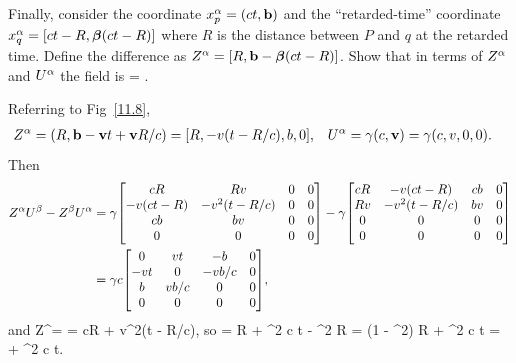 \newcommand{\Za}{Z^\alp}
\newcommand{\Zsa}{Z_\alp}
\newcommand{\Zb}{Z^\bet}
\newcommand{\vbet}{\boldsymbol{\beta}}

\begin{problem}
	Finally, consider the coordinate $x^\alpha_p = (ct, \vb{b})$ and the ``retarded-time'' coordinate $\xaq = [ct - R, \vbet(ct - R)]$ where $R$ is the distance between $P$ and $q$ at the retarded time.  Define the difference as $\Za = [R, \vbb - \vbet(ct - R)]$.  Show that in terms of $\Za$ and $U^\alpha$ the field is
	\beqn \label{show2.c}
		\Fab =  \frac{\Za \Ub - \Zb \Ua}{(\Usa \Za / c)^3}.
	\eeqn
\end{problem}
\vfix

\begin{solution}
	Referring to Fig~\ref{11.8},
	\begin{align*}
		\Za &= (R, \vbb - \vv t + \vv R / c) = [R, -v (t - R / c), b, 0], &
		\Ua &= \gam (c, \vv) = \gam (c, v, 0, 0).
	\end{align*}
	Then
	\begin{align*}
		\Za\Ub - \Zb \Ua &= \gam
			\mqty[c R & R v & 0 & 0 \\
				-v (c t - R) & -v^2 (t - R / c) & 0 & 0 \\
				c b & b v & 0 & 0 \\
				0 & 0 & 0 & 0 ]
			- \gam
			\mqty[ c R & -v (c t - R) & c b & 0 \\
				R v & -v^2 (t - R / c) & b v & 0 \\
				0 & 0 & 0 & 0 \\
				0 & 0 & 0 & 0 ] \\
		&= \gam c
			\mqty[0 & v t & -b & 0 \\
				-v t & 0 & -v b / c & 0 \\
				b & v b / c & 0 & 0 \\
				0 & 0 & 0 & 0 ],
	\end{align*}
	and
	\beq
		\Usa \Za = \gam \mqty[ c & -v & 0 & 0 ] \mqty[ R \\ -v (t - R / c) \\ b \\ 0 ]
		= \gam cR + \gam v^2(t - R/c),
	\eeq
	so
	\beq
		\frac{\Usa \Za}{c} = \gam R + \gam \bet^2 c t - \gam \bet^2 R
		= (1 - \bet^2) \gam R + \gam \bet^2 c t
		=  + \gam \bet^2 c t.
	\eeq
	

\end{solution}
